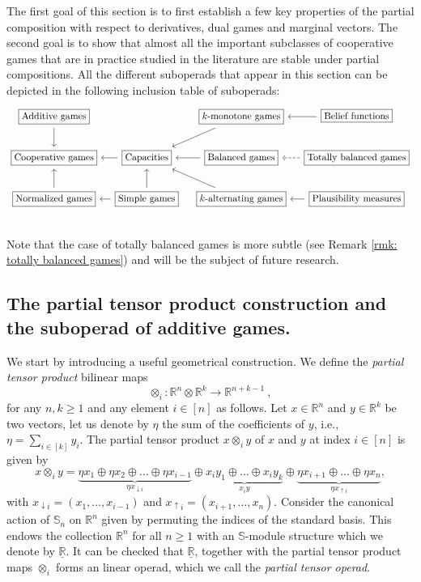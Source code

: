 \documentclass[a4paper,12pt]{amsart}
\begin{document}
The first goal of this section is to first establish a few key properties of the partial composition with respect to derivatives, dual games and marginal vectors. The second goal is to show that almost all the important subclasses of cooperative games that are in practice studied in the literature are stable under partial compositions. All the different suboperads that appear in this section can be depicted in the following inclusion table of suboperads:
\[
\begin{tikzcd}[row sep=2em, column sep=1em, ampersand replacement=\&]
    \boxed{\text{Additive games}} \arrow[d]
    \&
    \& \boxed{k\text{-monotone games}} \arrow[ld]
    \&\boxed{\text{Belief functions}} \arrow[l] \\
    \boxed{\text{Cooperative games}}
    \&\boxed{\text{Capacities}} \arrow[l] 
    \&\boxed{\text{Balanced games}} \arrow[l]
    \&\boxed{\text{Totally balanced games}} \arrow[l,dashed] \\
    \boxed{\text{Normalized games}} \arrow[u]
    \&\boxed{\text{Simple games}} \arrow[l] \arrow[u]
    \&\boxed{k\text{-alternating games}} \arrow[lu]
    \&\boxed{\text{Plausibility measures}} \arrow[l] \\
\end{tikzcd}
\]
Note that the case of totally balanced games is more subtle (see Remark \ref{rmk: totally balanced games}) and will be the subject of future research.

\subsection{The partial tensor product construction and the suboperad of additive games.}\label{subsection: partial tensor product} We start by introducing a useful geometrical construction. We define the  \textit{partial tensor product} bilinear maps
\[
\otimes_i: \mathbb{R}^n \otimes \mathbb{R}^{k} \longrightarrow \mathbb{R}^{n + k -1}~,
\]
for any $n,k \geq 1$ and any element $i \in [n]$ as follows. Let \(x \in \mathbb{R}^n\) and \(y \in \mathbb{R}^k\) be two vectors, let us denote by \( \eta\) the sum of the coefficients of \(y\), i.e., \(\eta = \sum_{i \in [k]} y_i\). The partial tensor product $x \otimes_i y$ of \(x\) and \(y\) at index \(i \in [n]\) is given by 
\[
x \otimes_i y = \underbrace{\eta x_1 \oplus \eta x_2 \oplus \ldots \oplus \eta x_{i-1}}_{\eta x_{\downarrow i}} \oplus \underbrace{x_i y_1 \oplus \ldots \oplus x_i y_k}_{x_i y} \oplus \underbrace{\eta x_{i+1} \oplus \ldots \oplus \eta x_n}_{\eta x_{\uparrow i}},  
\]
with \(x_{\downarrow i} = (x_1, \ldots, x_{i-1})\) and \(x_{\uparrow i} = (x_{i+1}, \ldots, x_n)\). Consider the canonical action of $\mathbb{S}_n$ on $\mathbb{R}^n$ given by permuting the indices of the standard basis. This endows the collection $\mathbb{R}^n$ for all $n \geq 1$ with an $\mathbb{S}$-module structure which we denote by  $\underline{\mathbb{R}}$. It can be checked that $\underline{\mathbb{R}}$, together with the partial tensor product maps $\otimes_i$ forms an linear operad, which we call the \textit{partial tensor operad}.
\end{document}
